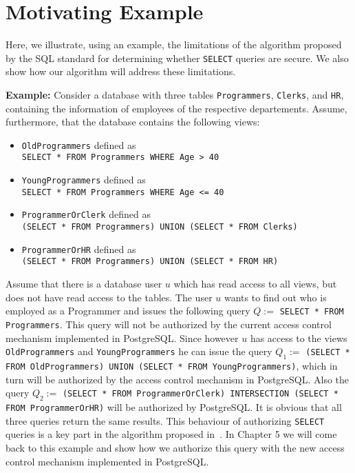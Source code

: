 \section{Motivating Example}

Here, we illustrate, using an example, the limitations of the algorithm proposed by the SQL standard for determining whether \texttt{SELECT} queries are secure.
%
We also show how our algorithm will address these limitations.


\smallskip
\noindent
{\bf Example:}
%
Consider a database with three tables \texttt{Programmers}, \texttt{Clerks}, and \texttt{HR}, containing the information of employees of the respective departements.
%
Assume, furthermore, that the database contains the following views:
\begin{itemize}
	\item \texttt{OldProgrammers} defined as \\ \texttt{SELECT * FROM Programmers WHERE Age > 40}
	\item \texttt{YoungProgrammers} defined as \\ \texttt{SELECT * FROM Programmers WHERE Age <= 40}
	\item \texttt{ProgrammerOrClerk} defined as \\ \texttt{(SELECT * FROM Programmers) UNION (SELECT * FROM Clerks)}
	\item \texttt{ProgrammerOrHR} defined as \\ \texttt{(SELECT * FROM Programmers) UNION (SELECT * FROM HR)}
\end{itemize}
%
Assume that there is a database user $u$ which has read access to all views, but does not have read access to the tables.
%
The user $u$ wants to find out who is employed as a Programmer and issues the following query $Q := $ \texttt{SELECT * FROM Programmers}. 
%
This query will not be authorized by the current access control mechanism implemented in PostgreSQL.
%
Since however $u$ has access to the views \texttt{OldProgrammers} and \texttt{YoungProgrammers} he can issue the query $Q_1 := $ \texttt{(SELECT * FROM OldProgrammers) UNION (SELECT * FROM YoungProgrammers)}, which in turn will be authorized by the access control mechanism in PostgreSQL.
%
Also the query $Q_2 := $ \texttt{(SELECT * FROM ProgrammerOrClerk) INTERSECTION (SELECT * FROM ProgrammerOrHR)} will be authorized by PostgreSQL.
%
It is obvious that all three queries return the same results.
%
This behaviour of authorizing \texttt{SELECT} queries is a key part in the algorithm proposed in~\cite{guarnieri2016strong}.
%
In Chapter 5 we will come back to this example and show how we authorize this query with the new access control mechanism implemented in PostgreSQL.
